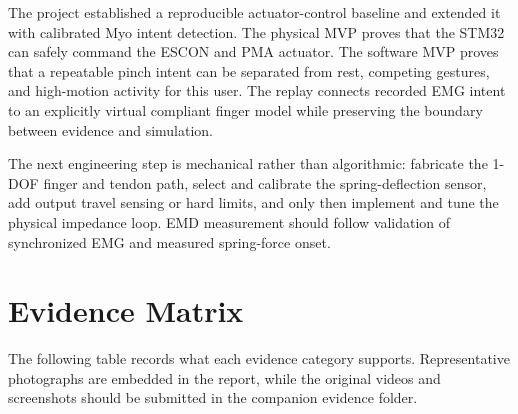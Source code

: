 \documentclass[11pt,a4paper]{report}
\begin{document}
The project established a reproducible actuator-control baseline and extended it with calibrated Myo intent detection. The physical MVP proves that the STM32 can safely command the ESCON and PMA actuator. The software MVP proves that a repeatable pinch intent can be separated from rest, competing gestures, and high-motion activity for this user. The replay connects recorded EMG intent to an explicitly virtual compliant finger model while preserving the boundary between evidence and simulation.

The next engineering step is mechanical rather than algorithmic: fabricate the 1-DOF finger and tendon path, select and calibrate the spring-deflection sensor, add output travel sensing or hard limits, and only then implement and tune the physical impedance loop. EMD measurement should follow validation of synchronized EMG and measured spring-force onset.

\appendix
\chapter{Evidence Matrix}

The following table records what each evidence category supports. Representative photographs are embedded in the report, while the original videos and screenshots should be submitted in the companion evidence folder.
\end{document}
